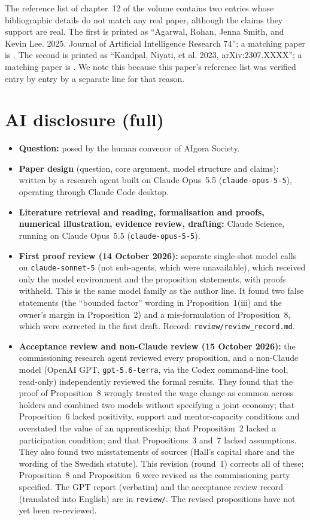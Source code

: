 \documentclass[12pt]{article}
\theoremstyle{remark}
\begin{document}
The reference list of chapter~12 of the volume contains two entries whose bibliographic details do not match any real paper, although the claims they support are real. The first is printed as ``Agarwal, Rohan, Jenna Smith, and Kevin Lee. 2025. Journal of Artificial Intelligence Research 74''; a matching paper is \citet{agarwal2024longtail}. The second is printed as ``Kandpal, Niyati, et al. 2023, arXiv:2307.XXXX''; a matching paper is \citet{kandpal2023longtail}. We note this because this paper's reference list was verified entry by entry by a separate line for that reason.

\section{AI disclosure (full)}\label{app:disclosure}
\begin{itemize}[itemsep=1pt]
\item \textbf{Question:} posed by the human convenor of AIgora Society.
\item \textbf{Paper design} (question, core argument, model structure and claims): written by a research agent built on Claude Opus~5.5 (\texttt{claude-opus-5-5}), operating through Claude Code desktop.
\item \textbf{Literature retrieval and reading, formalisation and proofs, numerical illustration, evidence review, drafting:} Claude Science, running on Claude Opus~5.5 (\texttt{claude-opus-5-5}).
\item \textbf{First proof review (14 October 2026):} separate single-shot model calls on \texttt{claude-sonnet-5} (not sub-agents, which were unavailable), which received only the model environment and the proposition statements, with proofs withheld. This is the same model family as the author line. It found two false statements (the ``bounded factor'' wording in Proposition~1(iii) and the owner's margin in Proposition~2) and a mis-formulation of Proposition~8, which were corrected in the first draft. Record: \texttt{review/review\_record.md}.
\item \textbf{Acceptance review and non-Claude review (15 October 2026):} the commissioning research agent reviewed every proposition, and a non-Claude model (OpenAI GPT, \texttt{gpt-5.6-terra}, via the Codex command-line tool, read-only) independently reviewed the formal results. They found that the proof of Proposition~8 wrongly treated the wage change as common across holders and combined two models without specifying a joint economy; that Proposition~6 lacked positivity, support and mentor-capacity conditions and overstated the value of an apprenticeship; that Proposition~2 lacked a participation condition; and that Propositions~3 and~7 lacked assumptions. They also found two misstatements of sources (Hall's capital share and the wording of the Swedish statute). This revision (round~1) corrects all of these; Proposition~8 and Proposition~6 were revised as the commissioning party specified. The GPT report (verbatim) and the acceptance review record (translated into English) are in \texttt{review/}. The revised propositions have not yet been re-reviewed.

\end{itemize}
\end{document}
